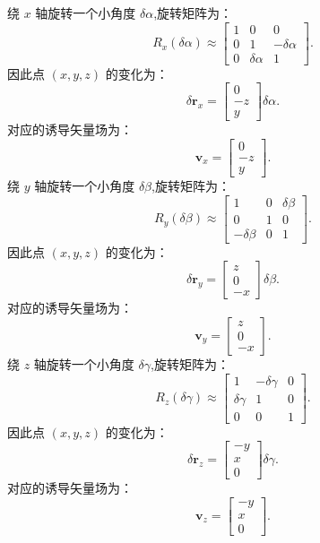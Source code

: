\documentclass[../main.tex]{subfiles}
\begin{document}
绕 \(x\) 轴旋转一个小角度 \(\delta\alpha\),旋转矩阵为：
\[
	R_x(\delta\alpha) \approx \begin{bmatrix}
		1 & 0            & 0             \\
		0 & 1            & -\delta\alpha \\
		0 & \delta\alpha & 1
	\end{bmatrix}.
\]
因此点 \((x, y, z)\) 的变化为：
\[
	\delta\bm{r}_x = \begin{bmatrix}
		0  \\
		-z \\
		y
	\end{bmatrix} \delta\alpha.
\]
对应的诱导矢量场为：
\[
	\bm{v}_x = \begin{bmatrix}
		0  \\
		-z \\
		y
	\end{bmatrix}.
\]
绕 \(y\) 轴旋转一个小角度 \(\delta\beta\),旋转矩阵为：
\[
	R_y(\delta\beta) \approx \begin{bmatrix}
		1            & 0 & \delta\beta \\
		0            & 1 & 0           \\
		-\delta\beta & 0 & 1
	\end{bmatrix}.
\]
因此点 \((x, y, z)\) 的变化为：
\[
	\delta\bm{r}_y = \begin{bmatrix}
		z \\
		0 \\
		-x
	\end{bmatrix} \delta\beta.
\]
对应的诱导矢量场为：
\[
	\bm{v}_y = \begin{bmatrix}
		z \\
		0 \\
		-x
	\end{bmatrix}.
\]
绕 \(z\) 轴旋转一个小角度 \(\delta\gamma\),旋转矩阵为：
\[
	R_z(\delta\gamma) \approx \begin{bmatrix}
		1            & -\delta\gamma & 0 \\
		\delta\gamma & 1             & 0 \\
		0            & 0             & 1
	\end{bmatrix}.
\]
因此点 \((x, y, z)\) 的变化为：
\[
	\delta\bm{r}_z = \begin{bmatrix}
		-y \\
		x  \\
		0
	\end{bmatrix} \delta\gamma.
\]
对应的诱导矢量场为：
\[
	\bm{v}_z = \begin{bmatrix}
		-y \\
		x  \\
		0
	\end{bmatrix}.
\]
\end{document}
